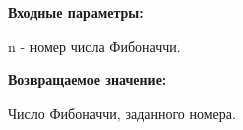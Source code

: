\textbf{Входные параметры:}  
 
 n - номер числа Фибоначчи.

\textbf{Возвращаемое значение:}
 
 Число Фибоначчи, заданного номера.